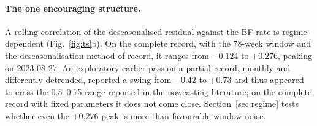 \documentclass[11pt,a4paper]{article}
\begin{document}
\paragraph{The one encouraging structure.} A rolling correlation of the deseasonalised residual
against the BF rate is regime-dependent (Fig.~\ref{fig:ts}b). On the complete record, with the
78-week window and the deseasonalisation method of record, it ranges from $-0.124$ to $+0.276$,
peaking on 2023-08-27. An exploratory earlier pass on a partial record, monthly and differently
detrended, reported a swing from $-0.42$ to $+0.73$ and thus appeared to cross the 0.5--0.75
range reported in the nowcasting literature; on the complete record with fixed parameters it does
not come close. Section~\ref{sec:regime} tests whether even the $+0.276$ peak is more than
favourable-window noise.
\end{document}
